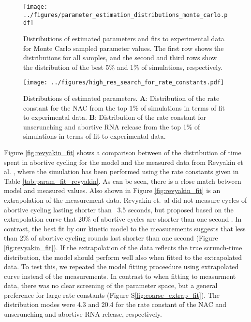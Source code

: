 \begin{figure}
	\begin{center}
      \texttt{[image: ../figures/parameter\_estimation\_distributions\_monte\_carlo.pdf]}
	\end{center}
    \caption{Distributions of estimated parameters and fits to experimental
      data for Monte Carlo sampled parameter values. The first row shows the
      distributions for all samples, and the second and third rows show the
      distribution of the best 5\% and 1\% of simulations, respectively.}
      \label{fig:parameter_estimation_1}
\end{figure}

\begin{figure}
	\begin{center}
      \texttt{[image: ../figures/high\_res\_search\_for\_rate\_constants.pdf]}
	\end{center}
    \caption{Distributions of estimated parameters. \textbf{A}: Distribution
      of the rate constant for the NAC from the top 1\% of simulations in terms
      of fit to experimental data. \textbf{B}: Distribution of the rate constant
      for unscrunching and abortive RNA release from the top 1\% of
      simulations in terms of fit to experimental data.}
      \label{fig:high_res_search}
\end{figure}

Figure \ref{fig:revyakin_fit} shows a comparison between of the distribution
of time spent in abortive cycling for the model and the measured data from
Revyakin et al. \cite{revyakin_abortive_2006}, where the simulation has been
performed using the rate constants given in Table
\ref{tab:param_fit_revyakin}. As can be seen, there is a close match between
model and measured values. Also shown in Figure \ref{fig:revyakin_fit} is an
extrapolation of the measurement data. Revyakin et.\ al did not measure cycles
of abortive cycling lasting shorter than ~3.5 seconds, but proposed based on
the extrapolation curve that 20\% of abortive cycles are shorter than one
second \cite{revyakin_abortive_2006}. In contrast, the best fit by our kinetic
model to the measurements suggests that less than 2\% of abortive cycling
rounds last shorter than one second (Figure \ref{fig:revyakin_fit}). If the
extrapolation of the data reflects the true scrunch-time distribution, the
model should perform well also when fitted to the extrapolated data. To test
this, we repeated the model fitting proceedure using extrapolated curve
instead of the measurements. In contrast to when fitting to measurment data,
there was no clear screening of the parameter space, but a general preference
for large rate constants (Figure S\ref{fig:coarse_extrap_fit}). The
distribution modes were 4.3 and 20.4 for the rate constant of the NAC and
unscrunching and abortive RNA release, respectively.


